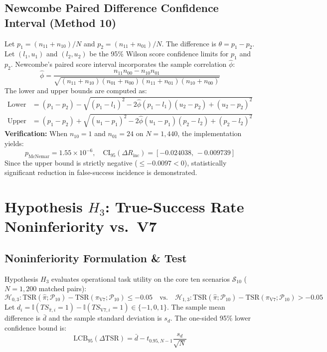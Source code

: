 \documentclass[10pt,a4paper]{article}
\begin{document}
\subsection{Newcombe Paired Difference Confidence Interval (Method 10)}
Let $p_1 = (n_{11} + n_{10}) / N$ and $p_2 = (n_{11} + n_{01}) / N$. The difference is $\theta = p_1 - p_2$. Let $(l_1, u_1)$ and $(l_2, u_2)$ be the 95\% Wilson score confidence limits for $p_1$ and $p_2$. Newcombe's paired score interval incorporates the sample correlation $\hat{\phi}$:
\begin{equation}
\hat{\phi} = \frac{n_{11} n_{00} - n_{10} n_{01}}{\sqrt{(n_{11} + n_{10})(n_{01} + n_{00})(n_{11} + n_{01})(n_{10} + n_{00})}}
\end{equation}
The lower and upper bounds are computed as:
\begin{align}
\text{Lower} &= (p_1 - p_2) - \sqrt{(p_1 - l_1)^2 - 2\hat{\phi}(p_1 - l_1)(u_2 - p_2) + (u_2 - p_2)^2} \\
\text{Upper} &= (p_1 - p_2) + \sqrt{(u_1 - p_1)^2 - 2\hat{\phi}(u_1 - p_1)(p_2 - l_2) + (p_2 - l_2)^2}
\end{align}
\noindent \textbf{Verification:} When $n_{10} = 1$ and $n_{01} = 24$ on $N = 1,440$, the implementation yields:
\begin{equation}
p_{\mathrm{McNemar}} = 1.55 \times 10^{-6}, \quad \mathrm{CI}_{95}(\Delta R_{\mathrm{inc}}) = [-0.024038, \, -0.009739]
\end{equation}
Since the upper bound is strictly negative ($\le -0.0097 < 0$), statistically significant reduction in false-success incidence is demonstrated.

\section{Hypothesis $H_3$: True-Success Rate Noninferiority vs.\ V7}

\subsection{Noninferiority Formulation \& Test}
Hypothesis $H_3$ evaluates operational task utility on the core ten scenarios $\mathcal{S}_{10}$ ($N = 1,200$ matched pairs):
\begin{equation}
\mathcal{H}_{0,3}: \mathrm{TSR}(\hat{\pi}; \mathcal{P}_{10}) - \mathrm{TSR}(\pi_{\mathrm{V7}}; \mathcal{P}_{10}) \le -0.05 \quad\text{vs.}\quad \mathcal{H}_{1,3}: \mathrm{TSR}(\hat{\pi}; \mathcal{P}_{10}) - \mathrm{TSR}(\pi_{\mathrm{V7}}; \mathcal{P}_{10}) > -0.05
\end{equation}
Let $d_i = \mathbb{I}(TS_{\hat{\pi}, i} = 1) - \mathbb{I}(TS_{\mathrm{V7}, i} = 1) \in \{-1, 0, 1\}$. The sample mean difference is $\bar{d}$ and the sample standard deviation is $s_d$. The one-sided 95\% lower confidence bound is:
\begin{equation}
\mathrm{LCB}_{95}(\Delta\mathrm{TSR}) = \bar{d} - t_{0.95, N-1} \frac{s_d}{\sqrt{N}}
\end{equation}
\end{document}
